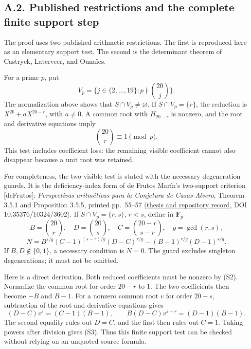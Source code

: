 \documentclass[
  british,
  10pt,
  a4paper,
]{article}
\begin{document}
\subsection*{A.2. Published restrictions and the complete finite support
step}\label{a.2.-published-restrictions-and-the-complete-finite-support-step}

The proof uses two published arithmetic restrictions. The first is
reproduced here as an elementary support test. The second is the
determinant theorem of Castryck, Laterveer, and Ounaïes.

For a prime \(p\), put \[
V_p=\{j\in\{2,\ldots,19\}:p\nmid\binom{20}{j}\}.
\] The normalization above shows that \(S\cap V_p\ne\varnothing\). If
\(S\cap V_p=\{r\}\), the reduction is \(X^{20}+aX^{20-r}\), with
\(a\ne0\). A common root with \(H_{20-r}\) is nonzero, and the root and
derivative equations imply \[
\binom{20}{r}\equiv1\pmod p.
\tag{S2}
\] This test includes coefficient loss: the remaining visible
coefficient cannot also disappear because a unit root was retained.

For completeness, the two-visible test is stated with the necessary
degeneration guards. It is the deficiency-index form of de Frutos
Marín's two-support criterion {[}deFrutos{]}: \emph{Perspectivas
aritméticas para la Conjetura de Casas-Alvero}, Theorem 3.5.1 and
Proposition 3.5.5, printed pp.~55--57
(\href{https://uvadoc.uva.es/handle/10324/3602?show=full}{thesis and
repository record}, DOI 10.35376/10324/3602). If \(S\cap V_p=\{r,s\}\),
\(r<s\), define in \(\mathbf F_p\) \[
B=\binom{20}{r},\quad D=\binom{20}{s},\quad
C=\binom{20-r}{s-r},\quad g=\gcd(r,s),
\] \[
N=B^{s/g}(C-1)^{(s-r)/g}(D-C)^{r/g}
 -(B-1)^{r/g}(D-1)^{s/g}.
\tag{S3}
\] If \(B,D\notin\{0,1\}\), a necessary condition is \(N=0\). The guard
excludes singleton degenerations; it must not be omitted.

Here is a direct derivation. Both reduced coefficients must be nonzero
by (S2). Normalize the common root for order \(20-r\) to 1. The two
coefficients then become \(-B\) and \(B-1\). For a nonzero common root
\(v\) for order \(20-s\), subtraction of the root and derivative
equations gives \[
(D-C)v^s=(C-1)(B-1),\qquad
B(D-C)v^{s-r}=(D-1)(B-1).
\] The second equality rules out \(D=C\), and the first then rules out
\(C=1\). Taking powers after division gives (S3). Thus this finite
support test can be checked without relying on an unquoted source
formula.
\end{document}
